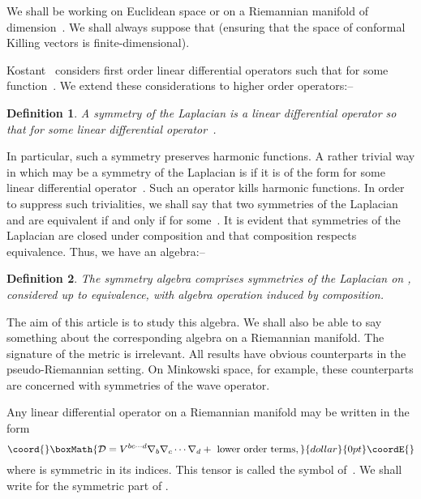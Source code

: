 \documentclass[a4paper,12pt]{amsart}
\newtheorem{defn}{Definition}
\begin{document}
We shall be working on Euclidean space \coordHE{}
or on a Riemannian manifold of dimension~\coordHE{}. We shall always suppose that
\coordHE{} (ensuring that the space of conformal Killing vectors is
finite-dimensional).

Kostant~\cite{kos} considers first order linear differential operators
\coordHE{} such that \coordHE{} for some function~\coordHE{}.
We extend these considerations to higher order operators:--
\begin{defn} A symmetry of the Laplacian is a linear differential
\mbox{operator} \coordHE{} so that \coordHE{} for
some linear differential operator~\myHighlight{$\delta$}\coordHE{}. \end{defn}
\noindent In particular, such a symmetry preserves harmonic functions. A
rather trivial way in which \coordHE{} may be a symmetry of the Laplacian
is if it is of the form \coordHE{} for some linear differential
operator~\coordHE{}. Such an operator kills harmonic functions. In order to
suppress such trivialities, we shall say that two symmetries of the Laplacian
\coordHE{} and \coordHE{} are equivalent if and only if
\coordHE{} for some~\coordHE{}. It
is evident that symmetries of the Laplacian are closed under composition and
that composition respects equivalence. Thus, we have an algebra:--
\begin{defn}\label{definitionofAn} The symmetry algebra \coordHE{}
comprises symmetries of the Laplacian on \coordHE{}, considered up to
equivalence, with algebra operation induced by composition. \end{defn}
\noindent The aim of this article is to study this algebra. We shall also be
able to say something about the corresponding algebra on a Riemannian manifold.
The signature of the metric is irrelevant. All results have obvious
counterparts in the pseudo-Riemannian setting. On Minkowski space, for
example, these counterparts are concerned with symmetries of the wave operator.

Any linear differential operator on a Riemannian manifold may be written in
the form
$$\coord{}\boxMath{{\mathcal D}=
V^{bc\cdots d}\nabla_b\nabla_c\cdots\nabla_d+\mbox{ lower order terms},}{dollar}{0pt}\coordE{}$$
where \coordHE{} is symmetric in its indices. This tensor is called the
symbol of~\coordHE{}. We shall write \coordHE{} for the
symmetric part of \coordHE{}.
\end{document}

